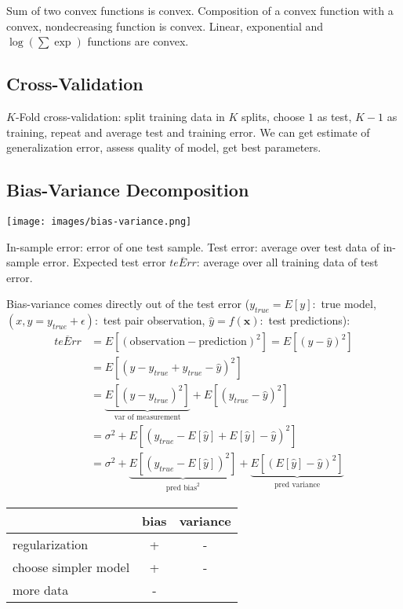 \documentclass[10pt,a4paper,landscape]{article}
\renewcommand{\bf}[1]{\ensuremath{\mathbf{#1}}}
\begin{document}
\begin{multicols*}{4}
Sum of two convex functions is convex. Composition of a convex function with a convex, nondecreasing function is convex. Linear, exponential and $\log(\sum \exp)$ functions are convex.

\subsection{Cross-Validation}
$K$-Fold cross-validation: split training data in $K$ splits, choose $1$ as test, $K-1$ as training, repeat and average test and training error. We can get estimate of generalization error, assess quality of model, get best parameters.

\subsection{Bias-Variance Decomposition}
\begin{colfig}
  \centering
  \texttt{[image: images/bias-variance.png]}
\end{colfig}

In-sample error: error of one test sample. Test error: average over test data of in-sample error. Expected test error $\overline{teErr}$: average over all training data of test error. 

Bias-variance comes directly out of the test error ($y_{true}=E[y]:$ true model, $(x,y = y_{true} + \epsilon):$ test pair observation, $\hat{y}=f(\bf{x}):$ test predictions):
 \begin{align*}
 \overline{teErr}
 &= E[(\text{observation} - \text{prediction})^2] = E[(y - \hat{y})^2] \\
 &= E[(y - y_{true} + y_{true} - \hat{y})^2] \\
 &=\underbrace{E[(y - y_{true})^2]}_{\text{var of measurement}} + E[(y_{true} - \hat{y})^2] \\
 &=\sigma^2 + E[(y_{true} - E[\hat{y}] + E[\hat{y}] - \hat{y})^2] \\
 &=\sigma^2 + \underbrace{E[(y_{true} - E[\hat{y}])^2]}_{\text{pred bias}^2} +\underbrace{E[(E[\hat{y}] - \hat{y})^2]}_{\text{pred variance}}
\end{align*}

\begin{tabular}{ l || c | c }
                          & bias & variance \\
  \hline
  regularization          & +    & - \\
  choose simpler model    & +    & - \\
  more data               & -    & \\
  \hline
\end{tabular}


\end{multicols*}
\end{document}
